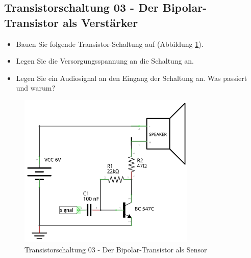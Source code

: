 
\subsection[Der Bipolar-Transistor als Verstärker]{Transistorschaltung 03 - Der Bipolar-Transistor als Verstärker}

\begin{itemize}
\itemsep1pt\parskip0pt
\item Bauen Sie folgende Transistor-Schaltung auf (Abbildung \ref{s03}). 
\item Legen Sie die Versorgungsspannung an die Schaltung an.
\item Legen Sie ein Audiosignal an den Eingang der Schaltung an. Was passiert und warum?
\end{itemize}

\begin{figure}[H]
	\centering
	\includegraphics[scale=1.6]{Transistor/Schaltungen/NPN_Verstaerker.pdf}
	\caption{Transistorschaltung 03 - Der Bipolar-Transistor als Sensor}
	\label{s03}
\end{figure}